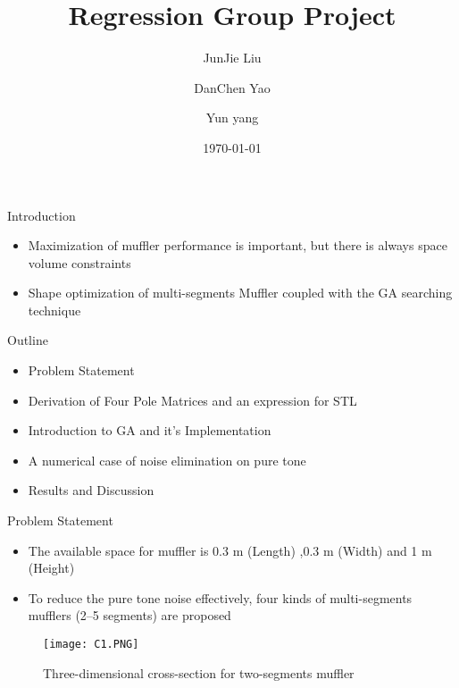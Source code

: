 \documentclass{beamer}
\title[Regression Group Project \hspace{0.5cm}\insertframenumber/\inserttotalframenumber]{Regression Group Project}
\author{JunJie Liu \and DanChen Yao \and Yun yang}
\institute{United International College \\ Zhuhai}
\date{\today}
\begin{document}
\begin{frame}
  \titlepage
\end{frame}



\begin{frame}{Introduction}

\begin{itemize}
  \item Maximization of muffler performance is
important, but there is always space volume constraints
  \item Shape optimization of multi-segments Muffler coupled with the GA
searching technique
\end{itemize}

\vskip 0.2cm

\begin{block}{Outline }
\vskip 0.1cm
\begin{itemize}
\item Problem Statement
\item Derivation of Four Pole Matrices and an expression for STL
\item Introduction to GA and it's Implementation
\item A numerical case of noise elimination on pure tone
\item Results and Discussion
\end{itemize}
\end{block}
\end{frame}


\begin{frame}{Problem Statement}

\begin{itemize}
  \item The available space for muffler is 0.3 m (Length) ,0.3
m (Width) and 1 m (Height)
  \item To reduce the pure tone noise effectively, four kinds of multi-segments mufflers (2–5 segments) are proposed
\end{itemize}
\begin{figure}
\texttt{[image: C1.PNG]}
\caption{\label{fig:your-figure1}Three-dimensional cross-section for two-segments muffler}
\end{figure}

\end{frame}
\end{document}
